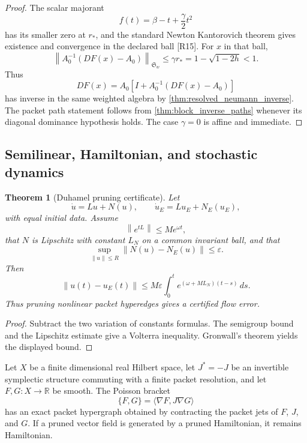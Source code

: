 \documentclass{aomart}
\newtheorem{theorem}{Theorem}[section]
\theoremstyle{definition}
\theoremstyle{remark}
\newcommand{\RR}{\mathbb R}
\newcommand{\norm}[1]{\left\lVert#1\right\rVert}
\newcommand{\Rcite}[1]{\textup{[#1]}}
\begin{document}
\begin{proof}
The scalar majorant
\[
 f(t)=\beta-t+\frac\gamma2t^2
\]
has its smaller zero at \(r_*\), and the standard Newton Kantorovich theorem gives existence and convergence in the declared ball \Rcite{R15}. For \(x\) in that ball,
\[
 \norm{A_0^{-1}(DF(x)-A_0)}_{\mathfrak S_w}
 \leq
 \gamma r_*
 =
 1-\sqrt{1-2h}
 <1.
\]
Thus
\[
 DF(x)
 =
 A_0\left[I+A_0^{-1}(DF(x)-A_0)\right]
\]
has inverse in the same weighted algebra by \cref{thm:resolved_neumann_inverse}. The packet path statement follows from \cref{thm:block_inverse_paths} whenever its diagonal dominance hypothesis holds. The case \(\gamma=0\) is affine and immediate.
\end{proof}

\subsection{Semilinear, Hamiltonian, and stochastic dynamics}

\begin{theorem}[Duhamel pruning certificate]\label{thm:duhamel_pruning}
Let
\[
 \dot u=Lu+N(u),
 \qquad
 \dot u_E=Lu_E+N_E(u_E),
\]
with equal initial data. Assume
\[
 \norm{e^{tL}}\leq Me^{\omega t},
\]
that \(N\) is Lipschitz with constant \(L_N\) on a common invariant ball, and that
\[
 \sup_{\norm u\leq R}\norm{N(u)-N_E(u)}\leq\varepsilon.
\]
Then
\[
 \boxed{
 \norm{u(t)-u_E(t)}
 \leq
 M\varepsilon
 \int_0^t
 e^{(\omega+ML_N)(t-s)}\,ds.
 }
\]
Thus pruning nonlinear packet hyperedges gives a certified flow error.
\end{theorem}

\begin{proof}
Subtract the two variation of constants formulas. The semigroup bound and the Lipschitz estimate give a Volterra inequality. Gronwall's theorem yields the displayed bound.
\end{proof}

\begin{proposition}\label{prop:hamiltonian_packets}
Let \(X\) be a finite dimensional real Hilbert space, let \(J^*=-J\) be an invertible symplectic structure commuting with a finite packet resolution, and let \(F,G:X\to\RR\) be smooth. The Poisson bracket
\[
 \{F,G\}
 =
 \langle\nabla F,J\nabla G\rangle
\]
has an exact packet hypergraph obtained by contracting the packet jets of \(F\), \(J\), and \(G\). If a pruned vector field is generated by a pruned Hamiltonian, it remains Hamiltonian.
\end{proposition}
\end{document}
